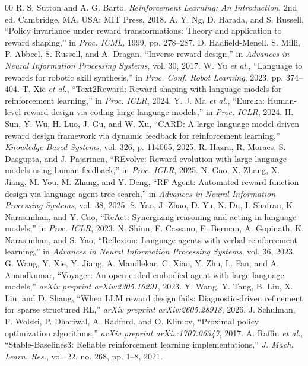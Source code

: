 \documentclass[conference]{IEEEtran}
\begin{document}
\enlargethispage{5\baselineskip}
\fontsize{6.7}{7.1}\selectfont
\begin{thebibliography}{00}
\setlength{\itemsep}{-1.2pt}
\setlength{\parskip}{0pt}
R. S. Sutton and A. G. Barto, \emph{Reinforcement Learning: An Introduction},
2nd ed. Cambridge, MA, USA: MIT Press, 2018.
A. Y. Ng, D. Harada, and S. Russell, ``Policy invariance under reward
transformations: Theory and application to reward shaping,'' in \emph{Proc.
ICML}, 1999, pp. 278--287.
D. Hadfield-Menell, S. Milli, P. Abbeel, S. Russell, and A. Dragan, ``Inverse
reward design,'' in \emph{Advances in Neural Information Processing Systems},
vol. 30, 2017.
W. Yu \emph{et al.}, ``Language to rewards for robotic skill synthesis,'' in
\emph{Proc. Conf. Robot Learning}, 2023, pp. 374--404.
T. Xie \emph{et al.}, ``Text2Reward: Reward shaping with language models for
reinforcement learning,'' in \emph{Proc. ICLR}, 2024.
Y. J. Ma \emph{et al.}, ``Eureka: Human-level reward design via coding large
language models,'' in \emph{Proc. ICLR}, 2024.
H. Sun, Y. Wu, H. Luo, J. Gu, and W. Xu, ``CARD: A large language model-driven
reward design framework via dynamic feedback for reinforcement learning,''
\emph{Knowledge-Based Systems}, vol. 326, p. 114065, 2025.
R. Hazra, R. Moraes, S. Dasgupta, and J. Pajarinen, ``REvolve: Reward evolution
with large language models using human feedback,'' in \emph{Proc. ICLR}, 2025.
N. Gao, X. Zhang, X. Jiang, M. You, M. Zhang, and Y. Deng, ``RF-Agent:
Automated reward function design via language agent tree search,'' in
\emph{Advances in Neural Information Processing Systems}, vol. 38, 2025.
S. Yao, J. Zhao, D. Yu, N. Du, I. Shafran, K. Narasimhan, and Y. Cao,
``ReAct: Synergizing reasoning and acting in language models,'' in
\emph{Proc. ICLR}, 2023.
N. Shinn, F. Cassano, E. Berman, A. Gopinath, K. Narasimhan, and S. Yao,
``Reflexion: Language agents with verbal reinforcement learning,'' in
\emph{Advances in Neural Information Processing Systems}, vol. 36, 2023.
G. Wang, Y. Xie, Y. Jiang, A. Mandlekar, C. Xiao, Y. Zhu, L. Fan, and A.
Anandkumar, ``Voyager: An open-ended embodied agent with large language
models,'' \emph{arXiv preprint arXiv:2305.16291}, 2023.
Y. Wang, Y. Tang, B. Liu, X. Liu, and D. Shang, ``When LLM reward design
fails: Diagnostic-driven refinement for sparse structured RL,'' \emph{arXiv
preprint arXiv:2605.28918}, 2026.
J. Schulman, F. Wolski, P. Dhariwal, A. Radford, and O. Klimov, ``Proximal
policy optimization algorithms,'' \emph{arXiv preprint arXiv:1707.06347}, 2017.
A. Raffin \emph{et al.}, ``Stable-Baselines3: Reliable reinforcement learning
implementations,'' \emph{J. Mach. Learn. Res.}, vol. 22, no. 268, pp. 1--8,
2021.
\end{thebibliography}
\end{document}
